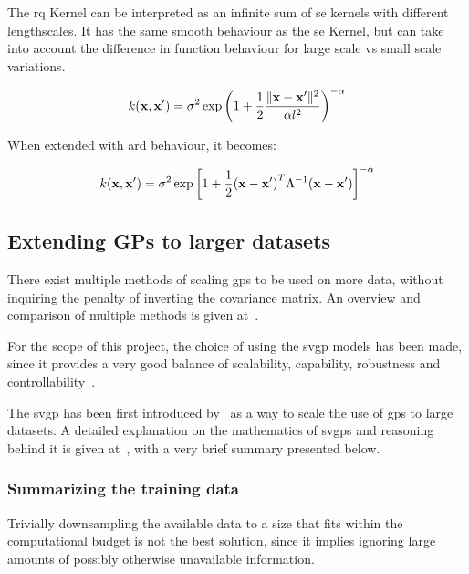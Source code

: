 The \acrfull{rq} Kernel can be interpreted as an infinite sum of \acrshort{se}
kernels with different lengthscales. It has the same smooth behaviour as the
\acrshort{se} Kernel, but can take into account the difference in function
behaviour for large scale vs small scale variations.

\begin{equation}
    k(\mathbf{x}, \mathbf{x'}) = \sigma^2 \exp{\left(1+\frac{1}{2}\frac{\lVert\mathbf{x} -
    \mathbf{x'}\rVert^2}{\alpha l^2}\right)}^{-\alpha}
\end{equation}

When extended with \acrshort{ard} behaviour, it becomes:

\begin{equation}
k(\mathbf{x}, \mathbf{x'})
= \sigma^2\exp{\left[1 + \frac{1}{2} {(\mathbf{x} - \mathbf{x'})}^T \Lambda^{-1}
(\mathbf{x} - \mathbf{x'})\right]}^{-\alpha} \\
\end{equation}



\subsection{Extending GPs to larger datasets}

There exist multiple methods of scaling \acrshort{gp}s to be used on more data,
without inquiring the penalty of inverting the covariance matrix. An overview
and comparison of multiple methods is given
at~\cite{liuUnderstandingComparingScalable2019}.

For the scope of this project, the choice of using the \acrshort{svgp} models
has been made, since it provides a very good balance of scalability, capability,
robustness and controllability~\cite{liuUnderstandingComparingScalable2019}.

The \acrshort{svgp} has been first introduced
by~\textcite{hensmanGaussianProcessesBig2013} as a way to scale the use of
\acrshort{gp}s to large datasets. A detailed explanation on the mathematics of
\acrshort{svgp}s and reasoning behind it is given
at~\cite{yiSparseVariationalGaussian2021}, with a very brief summary presented
below.

\subsubsection{Summarizing the training data}

Trivially downsampling the available data to a size that fits within the
computational budget is not the best solution, since it implies ignoring large
amounts of possibly otherwise unavailable information.

